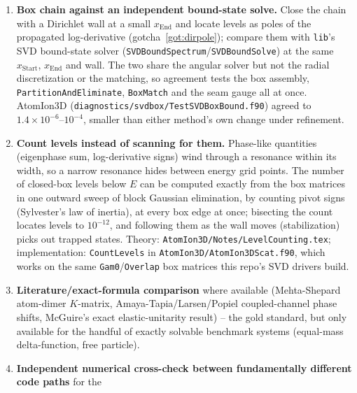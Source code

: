 \documentclass[11pt]{article}
\newcommand{\file}[1]{\texttt{#1}}
\newcommand{\sub}[1]{\texttt{#1}}
\begin{document}
\begin{enumerate}
  \textbf{Regenerate with:} run each driver at the settings above, then \file{MehtaShepardExact.x}
  (which reads \texttt{PhaseShift.dat} and writes \texttt{MehtaShepardExact.dat} with numerical and
  exact side by side). \textbf{Delete \texttt{PhaseShift.dat} before each run and check it
  reappeared} -- every driver here writes that same filename, so a failed run silently leaves the
  previous driver's output in place and the comparison then looks plausible but is meaningless.
\item \textbf{Box chain against an independent bound-state solve.} Close the chain with a
  Dirichlet wall at a small $x_{\text{End}}$ and locate levels as poles of the propagated
  log-derivative (gotcha~\ref{got:dirpole}); compare them with \file{lib}'s SVD bound-state solver
  (\sub{SVDBoundSpectrum}/\sub{SVDBoundSolve}) at the same $x_{\text{Start}}$, $x_{\text{End}}$ and
  wall. The two share the angular solver but not the radial discretization or the matching, so
  agreement tests the box assembly, \sub{PartitionAndEliminate}, \sub{BoxMatch} and the seam gauge
  all at once. AtomIon3D (\file{diagnostics/svdbox/TestSVDBoxBound.f90}) agreed to
  $1.4\times10^{-6}$--$10^{-4}$, smaller than either method's own change under refinement.
\item \textbf{Count levels instead of scanning for them.} Phase-like quantities (eigenphase sum,
  log-derivative signs) wind through a resonance within its width, so a narrow resonance hides
  between energy grid points. The number of closed-box levels below $E$ can be computed exactly
  from the box matrices in one outward sweep of block Gaussian elimination, by counting pivot signs
  (Sylvester's law of inertia), at every box edge at once; bisecting the count locates levels to
  $10^{-12}$, and following them as the wall moves (stabilization) picks out trapped states. Theory:
  \file{AtomIon3D/Notes/LevelCounting.tex}; implementation: \sub{CountLevels} in
  \file{AtomIon3D/AtomIon3DScat.f90}, which works on the same \texttt{Gam0}/\texttt{Overlap} box
  matrices this repo's SVD drivers build.
\item \textbf{Literature/exact-formula comparison} where available (Mehta-Shepard atom-dimer
  $K$-matrix, Amaya-Tapia/Larsen/Popiel coupled-channel phase shifts, McGuire's exact
  elastic-unitarity result) -- the gold standard, but only available for the handful of exactly
  solvable benchmark systems (equal-mass delta-function, free particle).
\item \textbf{Independent numerical cross-check between fundamentally different code paths} for the

\end{enumerate}
\end{document}
